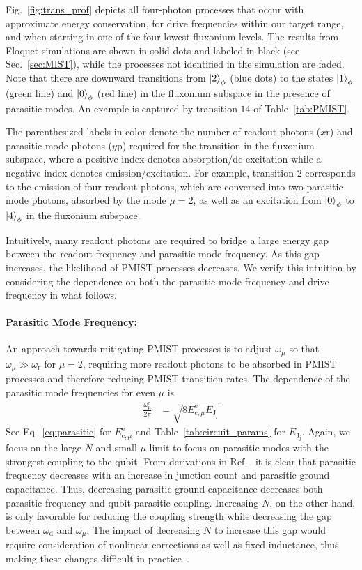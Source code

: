 \documentclass[%
reprint,
superscriptaddress,
 amsmath,amssymb,
 aps,
 prx,
longbibliography,
floatfix,
]{revtex4-2}
\begin{document}
Fig.~\ref{fig:trans_prof} depicts all four-photon processes that occur with approximate energy conservation, for drive frequencies within our target range, and when starting in one of the four lowest fluxonium levels. The results from Floquet simulations are shown in solid dots and labeled in black (see Sec.~\ref{sec:MIST}), while the processes not identified in the simulation are faded. Note that there are downward transitions from $\ket{2}_\phi$ (blue dots) to the states $\ket{1}_\phi$ (green line) and $\ket{0}_\phi$ (red line) in the fluxonium subspace in the presence of parasitic modes. An example is captured by transition $14$ of Table~\ref{tab:PMIST}.

The parenthesized labels in color denote the number of readout photons ($x \mathrm{r}$) and parasitic mode photons ($y\mathrm{p}$) required for the transition in the fluxonium subspace, where a positive index denotes absorption/de-excitation while a negative index denotes emission/excitation. For example, transition $2$ corresponds to the emission of four readout photons, which are converted into two parasitic mode photons, absorbed by the mode $\mu=2$, as well as an excitation from $\ket{0}_\phi$ to $\ket{4}_\phi$ in the fluxonium subspace.

Intuitively, many readout photons are required to bridge a large energy gap between the readout frequency and parasitic mode frequency. As this gap increases, the likelihood of PMIST processes decreases. We verify this intuition by considering the dependence on both the parasitic mode frequency and drive frequency in what follows.

\paragraph{Parasitic Mode Frequency:}
An approach towards mitigating PMIST processes is to adjust $\omega_\mu$ so that $\omega_\mu \gg \omega_\textrm{r}$ for $\mu=2$, requiring more readout photons to be absorbed in PMIST processes and therefore reducing PMIST transition rates. The dependence of the parasitic mode frequencies for even $\mu$ is
\begin{align}
    \frac{\omega_\mu^\textrm{e}}{2\pi}&=\sqrt{8E_{\textrm{c},\mu}^\textrm{e} E_{\textrm{J}_\textrm{j}}}
\end{align}
See Eq.~\ref{eq:parasitic} for $E_{\textrm{c},\mu}^\textrm{e}$ and Table~\ref{tab:circuit_params} for $E_{\textrm{J}_\textrm{j}}$. Again, we focus on the large $N$ and small $\mu$ limit to focus on parasitic modes with the strongest coupling to the qubit. From derivations in Ref.~\cite{viola2015collective} it is clear that parasitic frequency decreases with an increase in junction count and parasitic ground capacitance. Thus, decreasing parasitic ground capacitance decreases both parasitic frequency and qubit-parasitic coupling. Increasing $N$, on the other hand, is only favorable for reducing the coupling strength while decreasing the gap between $\omega_\textrm{d}$ and $\omega_\mu$. The impact of decreasing $N$ to increase this gap would require consideration of nonlinear corrections as well as fixed inductance, thus making these changes difficult in practice~\cite{viola2015collective}.
\end{document}

